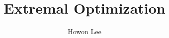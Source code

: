 \documentclass{beamer}
\begin{document}
\title{Extremal Optimization}
\author{Howon Lee}
\maketitle

\begin{frame}

\end{frame}
\end{document}
